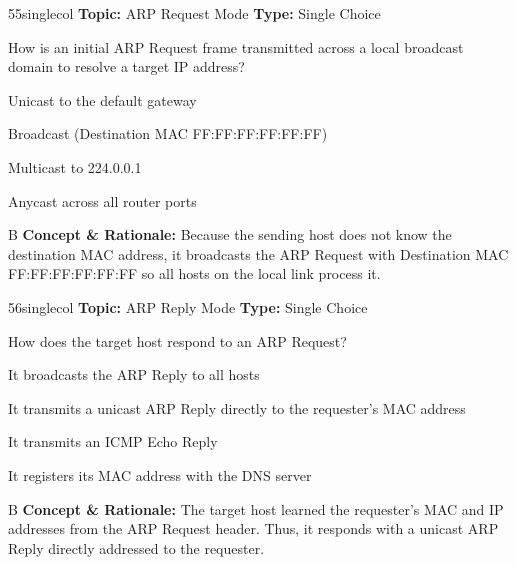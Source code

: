 \begin{qcard}{55}{singlecol}
\textcolor{darkslate!75}{\small\textbf{Topic:} ARP Request Mode \hfill \textbf{Type:} Single Choice}\vspace{0.4em}\par
How is an initial ARP Request frame transmitted across a local broadcast domain to resolve a target IP address?
\begin{qoptions}
\item Unicast to the default gateway
\item Broadcast (Destination MAC FF:FF:FF:FF:FF:FF)
\item Multicast to 224.0.0.1
\item Anycast across all router ports
\end{qoptions}
\end{qcard}
\nopagebreak
\begin{explainbox}{B}
\textbf{Concept \& Rationale:} Because the sending host does not know the destination MAC address, it broadcasts the ARP Request with Destination MAC FF:FF:FF:FF:FF:FF so all hosts on the local link process it.
\end{explainbox}

\begin{qcard}{56}{singlecol}
\textcolor{darkslate!75}{\small\textbf{Topic:} ARP Reply Mode \hfill \textbf{Type:} Single Choice}\vspace{0.4em}\par
How does the target host respond to an ARP Request?
\begin{qoptions}
\item It broadcasts the ARP Reply to all hosts
\item It transmits a unicast ARP Reply directly to the requester's MAC address
\item It transmits an ICMP Echo Reply
\item It registers its MAC address with the DNS server
\end{qoptions}
\end{qcard}
\nopagebreak
\begin{explainbox}{B}
\textbf{Concept \& Rationale:} The target host learned the requester's MAC and IP addresses from the ARP Request header. Thus, it responds with a unicast ARP Reply directly addressed to the requester.
\end{explainbox}

